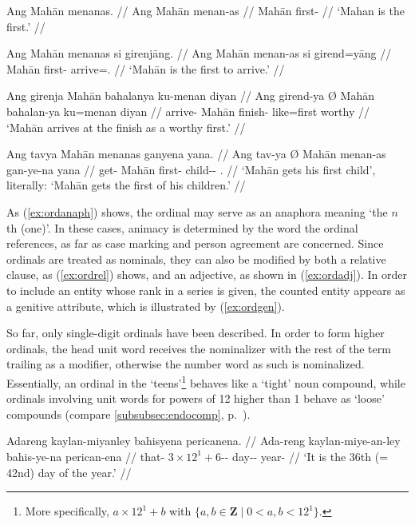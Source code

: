 \pex\label{ex:ord}
\a\label{ex:ordanaph}\begingl
	\gla Ang Mahān menanas. //
	\glb Ang Mahān menan-as //
	\glc \Aarg{} Mahān first-\Parg{} //
	\glft `Mahan is the first.' //
\endgl

\a\label{ex:ordrel}\begingl
	\gla Ang Mahān menanas si girenjāng. //
	\glb Ang Mahān menan-as si girend=yāng //
	\glc \Aarg{} Mahān first-\Parg{} \Rel{} arrive=\TsgM{}.\Aarg{} //
	\glft `Mahān is the first to arrive.' //
\endgl

\a\label{ex:ordadj}\begingl
	\gla Ang girenja {} Mahān bahalanya ku-menan diyan //
	\glb Ang girend-ya Ø Mahān bahalan-ya ku=menan diyan //
	\glc \Aarg{} arrive-\TsgM{} \Top{} Mahān finish-\Loc{} like=first 
		worthy //
	\glft `Mahān arrives at the finish as a worthy first.' //
\endgl

\a\label{ex:ordgen}\begingl
	\gla Ang tavya {} Mahān menanas ganyena yana. //
	\glb Ang tav-ya Ø Mahān menan-as gan-ye-na yana //
	\glc \AgtT{} get-\TsgM{} \Top{} Mahān first-\Parg{} child-\Pl{}-\Gen{} 
		\TsgM{}.\Gen{} //
	\glft `Mahān gets his first child', \\
		literally: `Mahān gets the first of his children.' //
\endgl

\xe

As (\ref{ex:ordanaph}) shows, the ordinal may serve as an anaphora meaning `the
$n$th (one)'. In these cases, animacy is determined by the word the ordinal
references, as far as case marking and person agreement are concerned. Since
ordinals are treated as nominals, they can also be modified by both a relative
clause, as (\ref{ex:ordrel}) shows, and an adjective, as shown in
(\ref{ex:ordadj}). In order to include an entity whose rank in a series is
given, the counted entity appears as a genitive attribute, which is illustrated
by (\ref{ex:ordgen}).

So far, only single-digit ordinals have been described. In order to form higher
ordinals, the head unit word receives the nominalizer with the rest of the term
trailing as a modifier, otherwise the number word as such is nominalized.
Essentially, an ordinal in the `teens'\footnote{More specifically, $a \times
12^1 + b$ with $\{a,b \in \textbf{Z} \mid 0 < a,b < 12^1\}$.} behaves like a
`tight' noun compound, while ordinals involving unit words for powers of 12
higher than 1 behave as `loose' compounds (compare
\autoref{subsubsec:endocomp}, p.~\pageref{loosecomp}). 

\pex
\a\label{ex:ordtightcomp}\begingl
	\gla Adareng kaylan-miyanley bahisyena pericanena. //
	\glb Ada-reng kaylan-miye-an-ley bahis-ye-na perican-ena //
	\glc that-\AargI{} {$3 \times 12^1 + 6$-\Nmlz{}-\PargI{}} 
		day-\Pl{}-\Gen{} year-\Gen{} //
	\glft `It is the 36th (=\,42nd) day of the year.' //
\endgl

